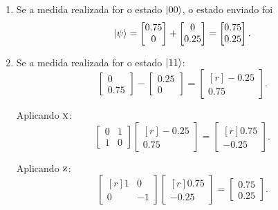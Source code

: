 \begin{enumerate}
  \item Se a medida realizada for o estado $\ket{00}$, o estado enviado foi
        \[\ket{\psi} = \begin{bmatrix} \num{0.75} \\ 0 \end{bmatrix} + \begin{bmatrix} 0 \\ \num{0.25} \end{bmatrix} = \begin{bmatrix} \num{0.75} \\ \num{0.25} \end{bmatrix}. \]

  \item Se a medida realizada for o estado $\ket{11}$:
        \[
        \begin{bmatrix} 0 \\ \num{0.75} \end{bmatrix} - \begin{bmatrix} \num{0.25} \\ 0 \end{bmatrix} = \begin{bmatrix*}[r] -\num{0.25} \\ \num{0.75} \end{bmatrix*}.
        \]

        Aplicando \(\operatorname{\textsc{x}}\):
        \[
        \begin{bmatrix} 0 & 1 \\ 1 & 0 \end{bmatrix} \begin{bmatrix*}[r] -\num{0.25} \\ \num{0.75} \end{bmatrix*} = \begin{bmatrix*}[r] \num{0.75} \\ -\num{0.25} \end{bmatrix*}.
        \]

        Aplicando \(\operatorname{\textsc{z}}\):
        \[
        \begin{bmatrix*}[r] 1 & 0 \\ 0 & -1 \end{bmatrix*}\begin{bmatrix*}[r] \num{0.75} \\ -\num{0.25} \end{bmatrix*} = \begin{bmatrix} \num{0.75} \\ \num{0.25} \end{bmatrix}.
        \]


\end{enumerate}

